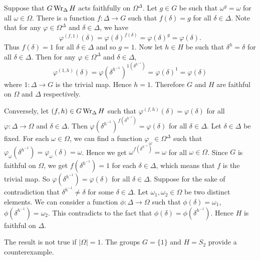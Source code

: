 \begin{sketch}
	Suppose that $G\operatorname{Wr}_\Delta H$ acts faithfully on $\Omega^\Delta$. Let $g\in G$ be such that $\omega^g =\omega$ for all $\omega\in\Omega$. There is a function $f:\Delta\to G$ such that $f(\delta) = g$ for all $\delta\in\Delta$. Note that for any $\varphi\in \Omega^\Delta$ and $\delta\in \Delta$, we have
	\begin{equation*}
		\varphi^{(f,1)}(\delta) = \varphi(\delta)^{f(\delta)} = \varphi(\delta)^g = \varphi(\delta).
	\end{equation*}
	Thus $f(\delta) = 1$ for all $\delta\in\Delta$ and so $g = 1$. Now let $h\in H$ be such that $\delta^h = \delta$ for all $\delta\in\Delta$. Then for  any $\varphi\in \Omega^\Delta$ and $\delta\in \Delta$, 
	\begin{equation*}
		\varphi^{(1,h)}(\delta) = \varphi(\delta^{h^{-1}})^{1(\delta^{h^{-1}})} = \varphi(\delta)^1 = \varphi(\delta)
	\end{equation*}
	where $1:\Delta\to G$ is the trivial map. Hence $h=1$. Therefore $G$ and $H$ are faithful on $\Omega$ and $\Delta$ respectively.
	
	Conversely, let $(f,h)\in G\operatorname{Wr}_{\Delta} H$ such that $\varphi^{(f,h)}(\delta) = \varphi(\delta)$ for all $\varphi:\Delta\to \Omega$ and $\delta\in \Delta$. Then $
		\varphi(\delta^{h^{-1}})^{f(\delta^{h^{-1}})} = \varphi(\delta)$ for all $\delta\in \Delta$. Let $\delta\in\Delta$ be fixed. For each $\omega\in \Omega$, we can find a function $\varphi_\omega\in \Omega^\Delta$ such that  $\varphi_\omega(\delta^{h^{-1}}) =\varphi_\omega(\delta) = \omega$. Hence we get $\omega^{f(\delta^{h^{-1}})} = \omega$ for all $\omega\in \Omega$. Since $G$ is faithful on $\Omega$, we get $f(\delta^{h^{-1}}) = 1$ for each $\delta\in \Delta$, which means that $f$ is the trivial map. So $\varphi(\delta^{h^{-1}}) = \varphi(\delta)$ for all $\delta\in \Delta$. Suppose for the sake of contradiction that $\delta^{h^{-1}}\neq \delta$ for some $\delta\in\Delta$. Let $\omega_1,\omega_2\in \Omega$ be two distinct elements. We can consider a function $\phi:\Delta\to \Omega$ such that $\phi(\delta) = \omega_1$, $\phi(\delta^{h^{-1}}) = \omega_2$. This contradicts to the fact that $\phi(\delta) = \phi(\delta^{h^{-1}})$. Hence $H$ is faithful on $\Delta$.
\end{sketch}
\begin{remark}
The result is not true if $|\Omega| = 1$. The groups $G=\{1\}$ and $H = S_2$ provide a counterexample.
\end{remark}

